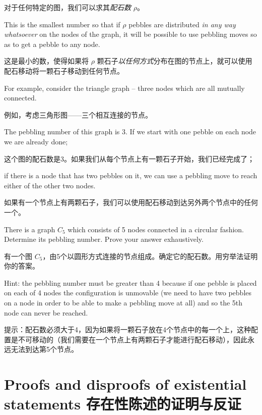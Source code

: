 对于任何特定的图，我们可以求其\emph{配石数} $\rho$。

This is the smallest number so that if $\rho$ pebbles are distributed {\em in any way whatsoever} on the nodes of the graph, it will be possible to use
pebbling moves so as to get a pebble to any node.

这是最小的数，使得如果将 $\rho$ 颗石子{\em 以任何方式}分布在图的节点上，就可以使用配石移动将一颗石子移动到任何节点。

For example, consider the triangle graph -- three nodes which are all
mutually connected.

例如，考虑三角形图——三个相互连接的节点。

The pebbling number of this graph is 3.  If we
start with one pebble on each node we are already done;

这个图的配石数是3。如果我们从每个节点上有一颗石子开始，我们已经完成了；

if there is a
node that has two pebbles on it, we can use a pebbling move to reach
either of the other two nodes.

如果有一个节点上有两颗石子，我们可以使用配石移动到达另外两个节点中的任何一个。

\begin{exer}
      There is a graph $C_5$ which consists of 5 nodes connected in a circular
      fashion.  Determine its pebbling number.
      Prove your answer exhaustively.

      有一个图 $C_5$，由5个以圆形方式连接的节点组成。确定它的配石数。用穷举法证明你的答案。

      Hint: the pebbling number must be greater than 4 because if one pebble is
      placed on each of 4 nodes the configuration is unmovable (we need to
      have two pebbles on a node in order to be able to make a pebbling move
      at all) and so the 5th node can never be reached.

      提示：配石数必须大于4，因为如果将一颗石子放在4个节点中的每一个上，这种配置是不可移动的（我们需要在一个节点上有两颗石子才能进行配石移动），因此永远无法到达第5个节点。
\end{exer}

\clearpage





\newpage


\section[Existential statements]{Proofs and disproofs of existential statements 存在性陈述的证明与反证}
\label{sec:exist}

